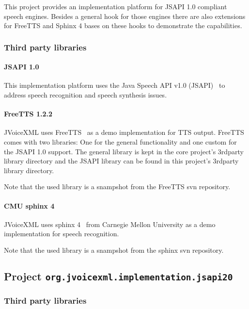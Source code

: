 \documentclass[11pt,a4paper]{article}
\begin{document}
This project provides an implementation platform for JSAPI 1.0 compliant
speech engines. Besides a general hook for those engines there are also
extensions for FreeTTS and Sphinx 4 bases on these hooks to demonstrate the
capabilities.

\subsubsection{Third party libraries}
\label{sec:jsapi10-third-party-libr}

\paragraph{JSAPI 1.0}

This implementation platform uses the Java Speech API v1.0
(JSAPI)~\cite{sun:jsapi} to address speech recognition and speech synthesis
issues.

\paragraph{FreeTTS 1.2.2}
\label{sec:freetts}

JVoiceXML uses FreeTTS~\cite{freetts} as a demo implementation for TTS output.
FreeTTS comes with two libraries: One for the general functionality and one
custom for the JSAPI 1.0 support.
The general library is kept in the core project's 3rdparty library directory
and the JSAPI library can be found in this project's 3rdparty library directory.

Note that the used library is a snampshot from the FreeTTS svn repository.

\paragraph{CMU sphinx 4}
\label{sec:sphinx}

JVoiceXML uses sphinx 4~\cite{sphinx} from Carnegie Mellon University
as a demo implementation for speech recognition.

Note that the used library is a snampshot from the sphinx svn repository.


\subsection{Project \lstinline{org.jvoicexml.implementation.jsapi20}}

\subsubsection{Third party libraries}
\label{sec:jsapi20-third-party-libr}
\end{document}
